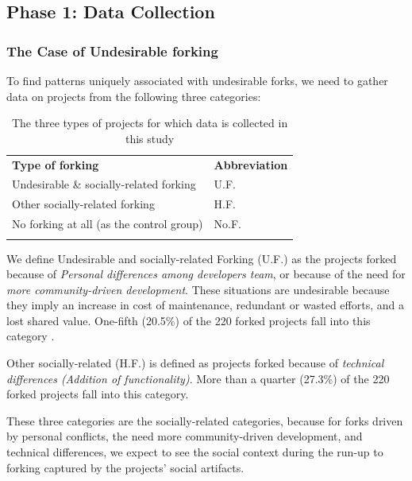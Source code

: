 \documentclass[11pt]{report}
\begin{document}
\subsection{Phase 1: Data Collection}
\label{DataCollection}

\subsubsection{The Case of Undesirable forking}
To find patterns uniquely associated with undesirable forks, we need to gather data on projects from the following three categories: 

\begin{table} [H]
\caption[Undesirable forking vs. Other categories]{The three types of projects for which data is collected in this study}
\label{tableUndesirableForkingDataCollect} 
\begin{tabular}{p{} p{}}
\hline\noalign{\smallskip}
\textbf{Type of forking} & \textbf{Abbreviation} \\
\noalign{\smallskip}\hline\noalign{\smallskip}
Undesirable \& socially-related forking & U.F. \\ \hline
Other socially-related forking & H.F. \\\hline
No forking at all (as the control group) & No.F. \\
\noalign{\smallskip}\hline
\end{tabular}
\end{table}

We define Undesirable and socially-related Forking (U.F.) as the projects forked because of \textit{Personal differences among developers team}, or because of the need for \textit{more community-driven development}. These situations are undesirable because they imply an increase in cost of maintenance, redundant or wasted efforts, and a lost shared value. One-fifth (20.5\%) of the 220 forked projects fall into this category \cite{Robles}.

Other socially-related (H.F.) is defined as projects forked because of \textit{technical differences (Addition of functionality)}. More than a quarter (27.3\%) of the 220 forked projects fall into this category.

These three categories are the socially-related categories, because for forks driven by personal conflicts, the need more community-driven development, and technical differences, we expect to see the social context during the run-up to forking captured by the projects' social artifacts.
\end{document}

